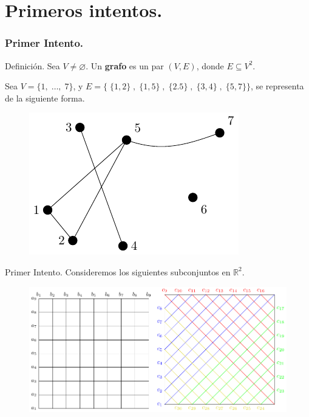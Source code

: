 \documentclass{beamer}
\begin{document}

\section{Primeros intentos.} %
\frame{\sectionpage}
\begin{frame}[t]
	\frametitle{Primer Intento.}
	\begin{block}{Definición.}
		Sea \(V \ne \varnothing\). Un \textbf{grafo} es un par \((V,E)\), donde \(E \subseteq V^2\).
	\end{block}
	\vspace{3mm}
	\begin{example}
		Sea \(V = \{1, \;\ldots,\; 7\}\), y \(E = \big\{\; \{1,2\} \;,\; \{1,5\} \;,\; \{2.5\} \;,\; \{3,4\} \;,\; \{5,7\}\big\}\), se representa de la siguiente forma.
		\begin{figure}[hbtp!]
			\centering
			\includegraphics[width= 0.5 \linewidth, page = 1]{IMAGENES/3_INT/1/tikz.pdf}
		\end{figure}
	\end{example}
\end{frame}

\begin{frame}[t]
	\begin{block}{Primer Intento.}
		Consideremos los siguientes subconjuntos en \(\mathbb{R} ^2\).
		\begin{figure}[hbtp!]
			\centering
			\includegraphics[width= 0.9 \linewidth, page = 1]{IMAGENES/3_INT/2/tikz.pdf}
		\end{figure}
	\end{block}
\end{frame}
\end{document}
